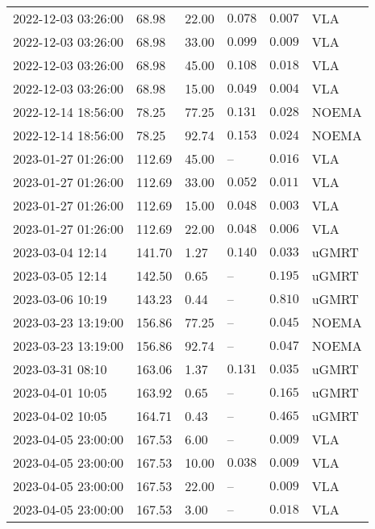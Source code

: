 \documentclass{nature_plusfigure}
\begin{document}
\begin{supplement}
\begin{center}
\begin{longtable}{llllll}
2022-12-03 03:26:00 & 68.98 & 22.00 & $0.078$ & $0.007$ & VLA \\ 
2022-12-03 03:26:00 & 68.98 & 33.00 & $0.099$ & $0.009$ & VLA \\ 
2022-12-03 03:26:00 & 68.98 & 45.00 & $0.108$ & $0.018$ & VLA \\ 
2022-12-03 03:26:00 & 68.98 & 15.00 & $0.049$ & $0.004$ & VLA \\ 
2022-12-14 18:56:00 & 78.25 & 77.25 & $0.131$ & $0.028$ & NOEMA \\ 
2022-12-14 18:56:00 & 78.25 & 92.74 & $0.153$ & $0.024$ & NOEMA \\ 
2023-01-27 01:26:00 & 112.69 & 45.00 & -- & $0.016$ & VLA \\ 
2023-01-27 01:26:00 & 112.69 & 33.00 & $0.052$ & $0.011$ & VLA \\ 
2023-01-27 01:26:00 & 112.69 & 15.00 & $0.048$ & $0.003$ & VLA \\ 
2023-01-27 01:26:00 & 112.69 & 22.00 & $0.048$ & $0.006$ & VLA \\ 
2023-03-04 12:14 & 141.70 & 1.27 & $0.140$ & $0.033$ & uGMRT \\ 
2023-03-05 12:14 & 142.50 & 0.65 & -- & $0.195$ & uGMRT \\ 
2023-03-06 10:19 & 143.23 & 0.44 & -- & $0.810$ & uGMRT \\ 
2023-03-23 13:19:00 & 156.86 & 77.25 & -- & $0.045$ & NOEMA \\ 
2023-03-23 13:19:00 & 156.86 & 92.74 & -- & $0.047$ & NOEMA \\ 
2023-03-31 08:10 & 163.06 & 1.37 & $0.131$ & $0.035$ & uGMRT \\ 
2023-04-01 10:05 & 163.92 & 0.65 & -- & $0.165$ & uGMRT \\ 
2023-04-02 10:05 & 164.71 & 0.43 & -- & $0.465$ & uGMRT \\ 
2023-04-05 23:00:00 & 167.53 & 6.00 & -- & $0.009$ & VLA \\ 
2023-04-05 23:00:00 & 167.53 & 10.00 & $0.038$ & $0.009$ & VLA \\ 
2023-04-05 23:00:00 & 167.53 & 22.00 & -- & $0.009$ & VLA \\ 
2023-04-05 23:00:00 & 167.53 & 3.00 & -- & $0.018$ & VLA \\ 
\hline 
\end{longtable} 
\end{center} 


\end{supplement}

\end{document}
